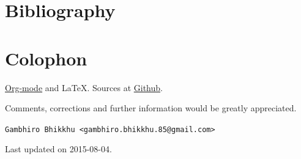 \documentclass[11pt,oneside]{memoir-article}
\begin{document}
\backmatter

\chapter{Bibliography}
\label{sec-6}
\label{bibliography}



\chapter{Colophon}
\label{sec-7}

\href{http://orgmode.org/}{Org-mode} and \LaTeX. Sources at \href{https://github.com/profound-labs/calculating-the-uposatha-moondays/}{Github}.

Comments, corrections and further information would be greatly
appreciated.

\texttt{Gambhiro Bhikkhu <gambhiro.bhikkhu.85@gmail.com>}

Last updated on 2015-08-04.
\end{document}
